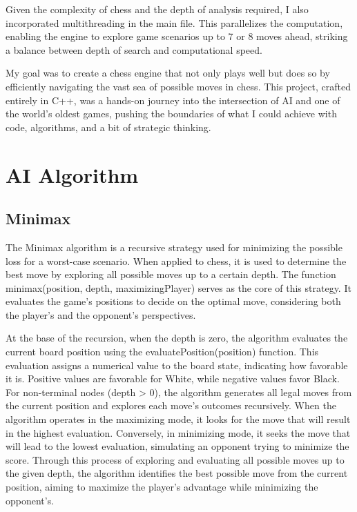 \documentclass{article}
\begin{document}
Given the complexity of chess and the depth of analysis required, I also incorporated multithreading in the main file. This parallelizes the computation, enabling the engine to explore game scenarios up to 7 or 8 moves ahead, striking a balance between depth of search and computational speed.

My goal was to create a chess engine that not only plays well but does so by efficiently navigating the vast sea of possible moves in chess. This project, crafted entirely in C++, was a hands-on journey into the intersection of AI and one of the world's oldest games, pushing the boundaries of what I could achieve with code, algorithms, and a bit of strategic thinking.
%



\section{AI Algorithm}
\subsection{Minimax}

The Minimax algorithm is a recursive strategy used for minimizing the possible loss for a worst-case scenario. When applied to chess, it is used to determine the best move by exploring all possible moves up to a certain depth. The function minimax(position, depth, maximizingPlayer) serves as the core of this strategy. It evaluates the game's positions to decide on the optimal move, considering both the player's and the opponent's perspectives.

At the base of the recursion, when the depth is zero, the algorithm evaluates the current board position using the evaluatePosition(position) function. This evaluation assigns a numerical value to the board state, indicating how favorable it is. Positive values are favorable for White, while negative values favor Black. For non-terminal nodes (depth > 0), the algorithm generates all legal moves from the current position and explores each move's outcomes recursively. When the algorithm operates in the maximizing mode, it looks for the move that will result in the highest evaluation. Conversely, in minimizing mode, it seeks the move that will lead to the lowest evaluation, simulating an opponent trying to minimize the score. Through this process of exploring and evaluating all possible moves up to the given depth, the algorithm identifies the best possible move from the current position, aiming to maximize the player's advantage while minimizing the opponent's.
\end{document}
